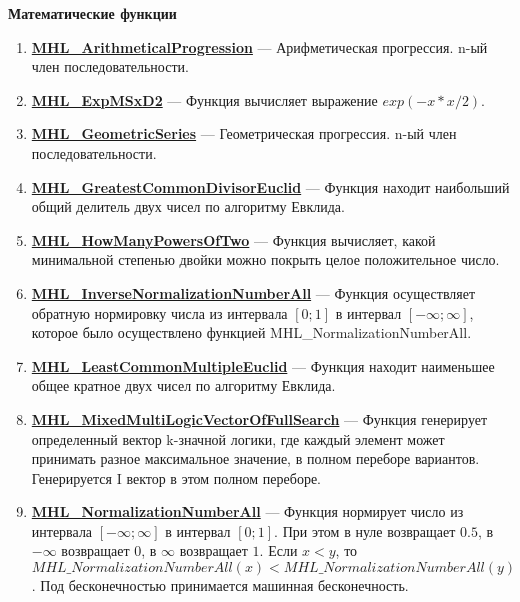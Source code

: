 \documentclass[a4paper,12pt]{article}
\begin{document}
\textbf{Математические функции}
\begin{enumerate}

\item \textbf{\hyperref[MHL_ArithmeticalProgression]{MHL\_ArithmeticalProgression}} --- Арифметическая прогрессия. n-ый член последовательности.

\item \textbf{\hyperref[MHL_ExpMSxD2]{MHL\_ExpMSxD2}} --- Функция вычисляет выражение $exp(-x*x/2)$.

\item \textbf{\hyperref[MHL_GeometricSeries]{MHL\_GeometricSeries}} --- Геометрическая прогрессия. n-ый член последовательности.

\item \textbf{\hyperref[MHL_GreatestCommonDivisorEuclid]{MHL\_GreatestCommonDivisorEuclid}} --- Функция находит наибольший общий делитель двух чисел по алгоритму Евклида.

\item \textbf{\hyperref[MHL_HowManyPowersOfTwo]{MHL\_HowManyPowersOfTwo}} --- Функция вычисляет, какой минимальной степенью двойки можно покрыть целое положительное число.

\item \textbf{\hyperref[MHL_InverseNormalizationNumberAll]{MHL\_InverseNormalizationNumberAll}} --- Функция осуществляет обратную нормировку числа из интервала $\left[0;1\right] $  в интервал $\left[-\infty;\infty \right] $, которое было осуществлено функцией MHL\_NormalizationNumberAll.

\item \textbf{\hyperref[MHL_LeastCommonMultipleEuclid]{MHL\_LeastCommonMultipleEuclid}} --- Функция находит наименьшее общее кратное двух чисел по алгоритму Евклида.

\item \textbf{\hyperref[MHL_MixedMultiLogicVectorOfFullSearch]{MHL\_MixedMultiLogicVectorOfFullSearch}} --- Функция генерирует определенный вектор k-значной логики, где каждый элемент может принимать разное максимальное значение, в полном переборе вариантов. Генерируется I вектор в этом полном переборе.

\item \textbf{\hyperref[MHL_NormalizationNumberAll]{MHL\_NormalizationNumberAll}} --- Функция нормирует число из интервала $\left[-\infty;\infty \right] $ в интервал $\left[0;1\right]$. При этом в нуле возвращает $0.5$, в $-\infty$ возвращает $0$, в $\infty$ возвращает $1$. Если $x<y$, то $MHL\_NormalizationNumberAll(x)<MHL\_NormalizationNumberAll(y)$. Под бесконечностью принимается машинная бесконечность.


\end{enumerate}
\end{document}
